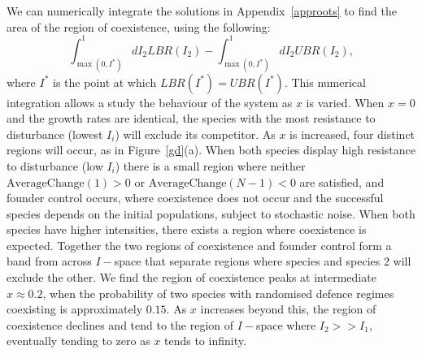 We can numerically integrate the solutions in Appendix~\ref{approots} to find the area of the region of coexistence, using the following:
\begin{equation}
\int_{\max(0,I^*)}^1 dI_2 LBR(I_2) - \int_{\max(0,I^*)}^1 dI_2 UBR(I_2),
\end{equation}
where $I^*$ is the point at which $LBR(I^*)=UBR(I^*)$. This numerical integration allows a study the behaviour of the system as $x$ is varied. When $x=0$ and the growth rates are identical, the species with the most resistance to disturbance (lowest $I_i$) will exclude its competitor.  As $x$ is increased, four distinct regions will occur, as in Figure~\ref{gd}(a). When both species display high resistance to disturbance (low $I_i$) there is a small region where neither $\text{AverageChange}(1)>0$ or $\text{AverageChange}(N-1)<0$ are satisfied, and founder control occurs, where coexistence does not occur and the successful species depends on the initial populations, subject to stochastic noise. When both species have higher intensities, there exists a region where coexistence is expected. Together the two regions of coexistence and founder control form a band from across $I-$space that separate regions where species and species 2 will exclude the other. We find the region of coexistence peaks at intermediate $x \approx 0.2$, when the probability of two species with randomised defence regimes coexisting is approximately $0.15$. As $x$ increases beyond this, the region of coexistence declines and tend to the region of $I-$space where $I_2>>I_1$, eventually tending to zero as $x$ tends to infinity.

